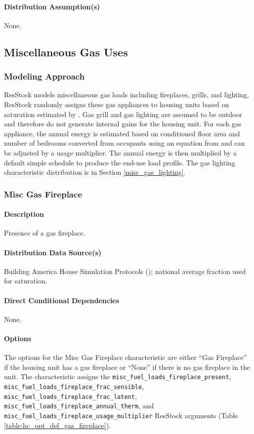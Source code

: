 \paragraph{Distribution Assumption(s)}
None.

\subsection{Miscellaneous Gas Uses}
\subsubsection{Modeling Approach}
ResStock models miscellaneous gas loads including fireplaces, grills, and lighting. ResStock randomly assigns these gas appliances to housing units based on saturation estimated by \citet{Wilson2014}.  Gas grill and gas lighting are assumed to be outdoor and therefore do not generate internal gains for the housing unit. For each gas appliance, the annual energy is estimated based on conditioned floor area and number of bedrooms converted from occupants using an equation from \citet{bahsp_2010} and can be adjusted by a usage multiplier. The annual energy is then multiplied by a default simple schedule to produce the end-use load profile. The gas lighting characteristic distribution is in Section \ref{misc_gas_lighting}.

\subsubsection{Misc Gas Fireplace}
\paragraph{Description}
Presence of a gas fireplace.

\paragraph{Distribution Data Source(s)}
Building America House Simulation Protocols (\cite{Wilson2014}); national average fraction used for saturation.

\paragraph{Direct Conditional Dependencies}
None.

\paragraph{Options}
The options for the Misc Gas Fireplace characteristic are either ``Gas Fireplace'' if the housing unit has a gas fireplace or ``None'' if there is no gas fireplace in the unit. The characteristic assigns the \texttt{misc\_fuel\_loads\_fireplace\_present}, \texttt{misc\_fuel\_loads\_fireplace\_frac\_sensible}, \texttt{misc\_fuel\_loads\_fireplace\_frac\_latent}, \texttt{misc\_fuel\_loads\_fireplace\_annual\_therm}, and \texttt{misc\_fuel\_loads\_fireplace\_usage\_multiplier} ResStock arguments (Table \ref{table:hc_opt_def_gas_fireplace}). 

